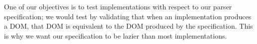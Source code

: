 %

One of our objectives is to test implementations
with respect to our parser specification;
we would test by validating that when an implementation produces a DOM,
that DOM is equivalent to the DOM produced by the specification.
This is why we want our specification to be lazier than most implementations.







